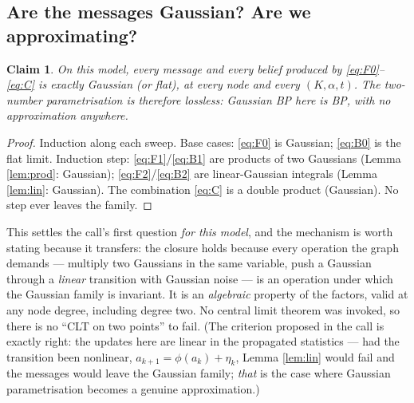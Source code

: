 \documentclass[11pt]{article}
\newtheorem{claim}{Claim}
\theoremstyle{definition}
\theoremstyle{remark}
\begin{document}
\subsection{Are the messages Gaussian? Are we approximating?}
\label{sec:gaussianity}

\begin{claim}\label{claim:closure}
On this model, every message and every belief produced by
\eqref{eq:F0}--\eqref{eq:C} is exactly Gaussian (or flat), at every node and
every $(K,\alpha,t)$. The two-number parametrisation is therefore lossless:
\emph{Gaussian BP here is BP}, with no approximation anywhere.
\end{claim}
\begin{proof}
Induction along each sweep. Base cases: \eqref{eq:F0} is Gaussian;
\eqref{eq:B0} is the flat limit. Induction step: \eqref{eq:F1}/\eqref{eq:B1}
are products of two Gaussians (Lemma \ref{lem:prod}: Gaussian);
\eqref{eq:F2}/\eqref{eq:B2} are linear-Gaussian integrals (Lemma
\ref{lem:lin}: Gaussian). The combination \eqref{eq:C} is a double product
(Gaussian). No step ever leaves the family.
\end{proof}

This settles the call's first question \emph{for this model}, and the
mechanism is worth stating because it transfers: the closure holds because
every operation the graph demands --- multiply two Gaussians in the same
variable, push a Gaussian through a \emph{linear} transition with Gaussian
noise --- is an operation under which the Gaussian family is invariant. It
is an \emph{algebraic} property of the factors, valid at any node degree,
including degree two. No central limit theorem was invoked, so there is no
``CLT on two points'' to fail. (The criterion proposed in the call is
exactly right: the updates here are linear in the propagated statistics ---
had the transition been nonlinear, $a_{k+1}=\phi(a_k)+\eta_k$, Lemma
\ref{lem:lin} would fail and the messages would leave the Gaussian family;
\emph{that} is the case where Gaussian parametrisation becomes a genuine
approximation.)
\end{document}
